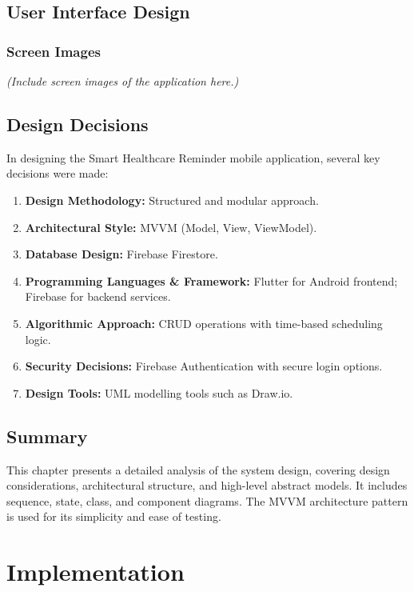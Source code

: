 \documentclass[12pt, a4paper, oneside]{report}
\begin{document}
\section{User Interface Design}
\subsection{Screen Images}
\textit{(Include screen images of the application here.)}

\section{Design Decisions}

In designing the Smart Healthcare Reminder mobile application, several key decisions were made:

\begin{enumerate}
    \item \textbf{Design Methodology:} Structured and modular approach.
    \item \textbf{Architectural Style:} MVVM (Model, View, ViewModel).
    \item \textbf{Database Design:} Firebase Firestore.
    \item \textbf{Programming Languages \& Framework:} Flutter for Android frontend; Firebase for backend services.
    \item \textbf{Algorithmic Approach:} CRUD operations with time-based scheduling logic.
    \item \textbf{Security Decisions:} Firebase Authentication with secure login options.
    \item \textbf{Design Tools:} UML modelling tools such as Draw.io.
\end{enumerate}

\section{Summary}

This chapter presents a detailed analysis of the system design, covering design considerations, architectural structure, and high-level abstract models. It includes sequence, state, class, and component diagrams. The MVVM architecture pattern is used for its simplicity and ease of testing.

\chapter{Implementation}
\label{ch:implementation}
\end{document}
